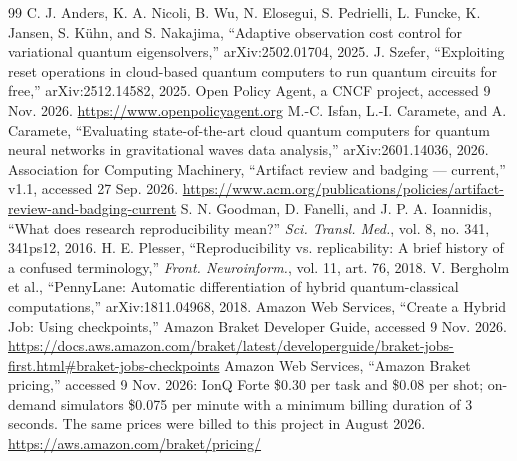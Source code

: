 \documentclass[acmsmall,screen,review]{acmart}
\begin{document}
\begin{thebibliography}{99}
 C. J. Anders, K. A. Nicoli, B. Wu, N. Elosegui, S. Pedrielli, L. Funcke, K. Jansen, S. K\"{u}hn, and S. Nakajima, ``Adaptive observation cost control for variational quantum eigensolvers,'' arXiv:2502.01704, 2025.
 J. Szefer, ``Exploiting reset operations in cloud-based quantum computers to run quantum circuits for free,'' arXiv:2512.14582, 2025.
 Open Policy Agent, a CNCF project, accessed 9 Nov. 2026. {\url{https://www.openpolicyagent.org}}
 M.-C. Isfan, L.-I. Caramete, and A. Caramete, ``Evaluating state-of-the-art cloud quantum computers for quantum neural networks in gravitational waves data analysis,'' arXiv:2601.14036, 2026.
 Association for Computing Machinery, ``Artifact review and badging --- current,'' v1.1, accessed 27 Sep. 2026. {\url{https://www.acm.org/publications/policies/artifact-review-and-badging-current}}
 S. N. Goodman, D. Fanelli, and J. P. A. Ioannidis, ``What does research reproducibility mean?'' \textit{Sci. Transl. Med.}, vol. 8, no. 341, 341ps12, 2016.
 H. E. Plesser, ``Reproducibility vs. replicability: A brief history of a confused terminology,'' \textit{Front. Neuroinform.}, vol. 11, art. 76, 2018.
 V. Bergholm et al., ``PennyLane: Automatic differentiation of hybrid quantum-classical computations,'' arXiv:1811.04968, 2018.
 Amazon Web Services, ``Create a Hybrid Job: Using checkpoints,'' Amazon Braket Developer Guide, accessed 9 Nov. 2026. {\url{https://docs.aws.amazon.com/braket/latest/developerguide/braket-jobs-first.html#braket-jobs-checkpoints}}
 Amazon Web Services, ``Amazon Braket pricing,'' accessed 9 Nov. 2026: IonQ Forte \$0.30 per task and \$0.08 per shot; on-demand simulators \$0.075 per minute with a minimum billing duration of 3 seconds. The same prices were billed to this project in August 2026. {\url{https://aws.amazon.com/braket/pricing/}}
\end{thebibliography}
\end{document}
